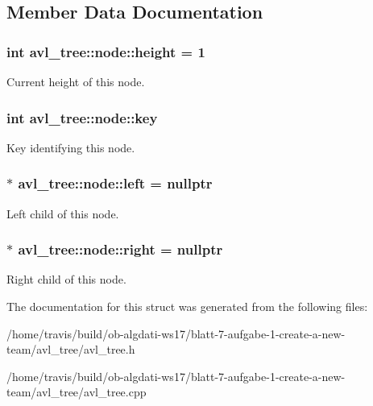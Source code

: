 \subsection{Member Data Documentation}
\hypertarget{structavl__tree_1_1node_a57a93259cb3f71b15fe737a559d8f0cc}{
\subsubsection[{height}]{\setlength{\rightskip}{0pt plus 5cm}int avl\-\_\-tree\-::node\-::height = 1}}\label{structavl__tree_1_1node_a57a93259cb3f71b15fe737a559d8f0cc}
Current height of this node. \hypertarget{structavl__tree_1_1node_a07b67fe6e79e2272835dd6485272b823}{
\subsubsection[{key}]{\setlength{\rightskip}{0pt plus 5cm}int avl\-\_\-tree\-::node\-::key}}\label{structavl__tree_1_1node_a07b67fe6e79e2272835dd6485272b823}
Key identifying this node. \hypertarget{structavl__tree_1_1node_a3e7851f7104dd71af924b27e70d80f3a}{
\subsubsection[{left}]{$\ast$ avl\-\_\-tree\-::node\-::left = nullptr}}\label{structavl__tree_1_1node_a3e7851f7104dd71af924b27e70d80f3a}
Left child of this node. \hypertarget{structavl__tree_1_1node_aff21ea47ae19da99113bd7900fb69785}{
\subsubsection[{right}]{$\ast$ avl\-\_\-tree\-::node\-::right = nullptr}}\label{structavl__tree_1_1node_aff21ea47ae19da99113bd7900fb69785}
Right child of this node. 

The documentation for this struct was generated from the following files\-:\begin{DoxyCompactItemize}
\item 
/home/travis/build/ob-\/algdati-\/ws17/blatt-\/7-\/aufgabe-\/1-\/create-\/a-\/new-\/team/avl\-\_\-tree/avl\-\_\-tree.\-h\item 
/home/travis/build/ob-\/algdati-\/ws17/blatt-\/7-\/aufgabe-\/1-\/create-\/a-\/new-\/team/avl\-\_\-tree/avl\-\_\-tree.\-cpp\end{DoxyCompactItemize}
